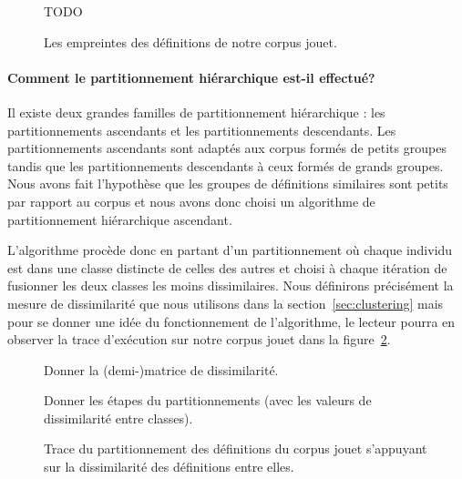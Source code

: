 \begin{figure}
TODO
\caption{Les empreintes des définitions de notre corpus jouet.}
\label{fig:hash}
\end{figure}

\paragraph{Comment le partitionnement hiérarchique est-il effectué?}

Il existe deux grandes familles de partitionnement hiérarchique : les
partitionnements ascendants et les partitionnements descendants. Les
partitionnements ascendants sont adaptés aux corpus formés de petits
groupes tandis que les partitionnements descendants à ceux formés de
grands groupes. Nous avons fait l'hypothèse que les groupes de
définitions similaires sont petits par rapport au corpus et nous avons
donc choisi un algorithme de partitionnement hiérarchique ascendant.

L'algorithme procède donc en partant d'un partitionnement où chaque
individu est dans une classe distincte de celles des autres et choisi
à chaque itération de fusionner les deux classes les moins
dissimilaires. Nous définirons précisément la mesure de dissimilarité
que nous utilisons dans la section~\ref{sec:clustering} mais pour
se donner une idée du fonctionnement de l'algorithme, le lecteur
pourra en observer la trace d'exécution sur notre corpus jouet
dans la figure~\ref{fig:clustering-jouet}.

\begin{figure}

Donner la (demi-)matrice de dissimilarité.

Donner les étapes du partitionnements (avec les valeurs de dissimilarité entre classes).

\caption{Trace du partitionnement des définitions du corpus jouet s'appuyant sur la dissimilarité
des définitions entre elles.}
\label{fig:clustering-jouet}
\end{figure}

